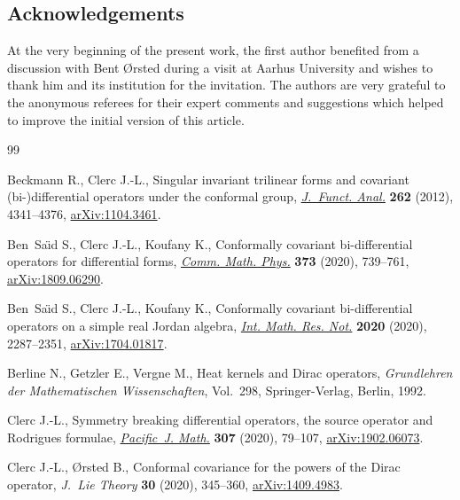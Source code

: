 \documentclass[pdftex]{sigma}
\numberwithin{equation}{section}
\begin{document}
\subsection*{Acknowledgements}
 At the very beginning of the present work, the first author benefited from a discussion with Bent {\O}rsted during a visit at Aarhus University and wishes to thank him and its institution for the invitation. The authors are very grateful to the anonymous referees for their expert comments and suggestions which helped to improve the initial version of this article.

\begin{thebibliography}{99}
\footnotesize\itemsep=0pt

Beckmann R., Clerc J.-L., Singular invariant trilinear forms and covariant
 (bi-)differential operators under the conformal group, \href{https://doi.org/10.1016/j.jfa.2012.02.021}{\textit{J.~Funct.
 Anal.}} \textbf{262} (2012), 4341--4376, \href{https://arxiv.org/abs/1104.3461}{arXiv:1104.3461}.

Ben~Sa\"{\i}d S., Clerc J.-L., Koufany K., Conformally covariant bi-differential
 operators for differential forms, \href{https://doi.org/10.1007/s00220-019-03431-6}{\textit{Comm. Math. Phys.}} \textbf{373}
 (2020), 739--761, \href{https://arxiv.org/abs/1809.06290}{arXiv:1809.06290}.

Ben~Sa\"{\i}d S., Clerc J.-L., Koufany K., Conformally covariant bi-differential
 operators on a simple real {J}ordan algebra, \href{https://doi.org/10.1093/imrn/rny082}{\textit{Int. Math. Res. Not.}}
 \textbf{2020} (2020), 2287--2351, \href{https://arxiv.org/abs/1704.01817}{arXiv:1704.01817}.

Berline N., Getzler E., Vergne M., Heat kernels and {D}irac operators,
 \textit{Grundlehren der Mathematischen Wissenschaften}, Vol.~298, Springer-Verlag, Berlin, 1992.

Clerc J.-L., Symmetry breaking differential operators, the source operator and
 {R}odrigues formulae, \href{https://doi.org/10.2140/pjm.2020.307.79}{\textit{Pacific~J. Math.}} \textbf{307} (2020), 79--107,
 \href{https://arxiv.org/abs/1902.06073}{arXiv:1902.06073}.

Clerc J.-L., {\O}rsted B., Conformal covariance for the powers of the {D}irac
 operator, \textit{J.~Lie Theory} \textbf{30} (2020), 345--360,
 \href{https://arxiv.org/abs/1409.4983}{arXiv:1409.4983}.


\end{thebibliography}
\end{document}
